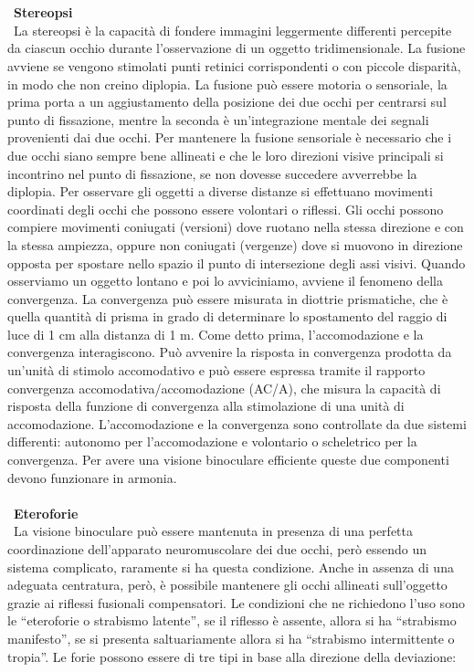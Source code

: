 \\\ \\\
\textbf{Stereopsi}
\\\
La stereopsi è la capacità di fondere immagini leggermente differenti percepite da ciascun occhio durante l’osservazione di un oggetto tridimensionale. La fusione avviene se vengono stimolati punti retinici corrispondenti o con piccole disparità, in modo che non creino diplopia. La fusione può essere motoria o sensoriale, la prima porta a un aggiustamento della posizione dei due occhi per centrarsi sul punto di fissazione, mentre la seconda è un’integrazione mentale dei segnali provenienti dai due occhi. Per mantenere la fusione sensoriale è necessario che i due occhi siano sempre bene allineati e che le loro direzioni visive principali si incontrino nel punto di fissazione, se non dovesse succedere avverrebbe la diplopia.
Per osservare gli oggetti a diverse distanze si effettuano movimenti coordinati degli occhi che possono essere volontari o riflessi. Gli occhi possono compiere movimenti coniugati (versioni) dove ruotano nella stessa direzione e con la stessa ampiezza, oppure non coniugati (vergenze) dove si muovono in direzione opposta per spostare nello spazio il punto di intersezione degli assi visivi. Quando osserviamo un oggetto lontano e poi lo avviciniamo, avviene il fenomeno della convergenza. La convergenza può essere misurata in diottrie prismatiche, che è quella quantità di prisma in grado di determinare lo spostamento del raggio di luce di 1 cm alla distanza di 1 m. 
Come detto prima, l’accomodazione e la convergenza interagiscono. Può avvenire la risposta in convergenza prodotta da un’unità di stimolo accomodativo e può essere espressa tramite il rapporto convergenza accomodativa/accomodazione (AC/A), che misura la capacità di risposta della funzione di convergenza alla stimolazione di una unità di accomodazione. L’accomodazione e la convergenza sono controllate da due sistemi differenti: autonomo per l’accomodazione e volontario o scheletrico per la convergenza. Per avere una visione binoculare efficiente queste due componenti devono funzionare in armonia.
\\\ \\\
\textbf{Eteroforie}
\\\
La visione binoculare può essere mantenuta in presenza di una perfetta coordinazione dell’apparato neuromuscolare dei due occhi, però essendo un sistema complicato, raramente si ha questa condizione. Anche in assenza di una adeguata centratura, però, è possibile mantenere gli occhi allineati sull’oggetto grazie ai riflessi fusionali compensatori. Le condizioni che ne richiedono l’uso sono le “eteroforie o strabismo latente”, se il riflesso è assente, allora si ha “strabismo manifesto”, se si presenta saltuariamente allora si ha “strabismo intermittente o tropia”. Le forie possono essere di tre tipi in base alla direzione della deviazione:
